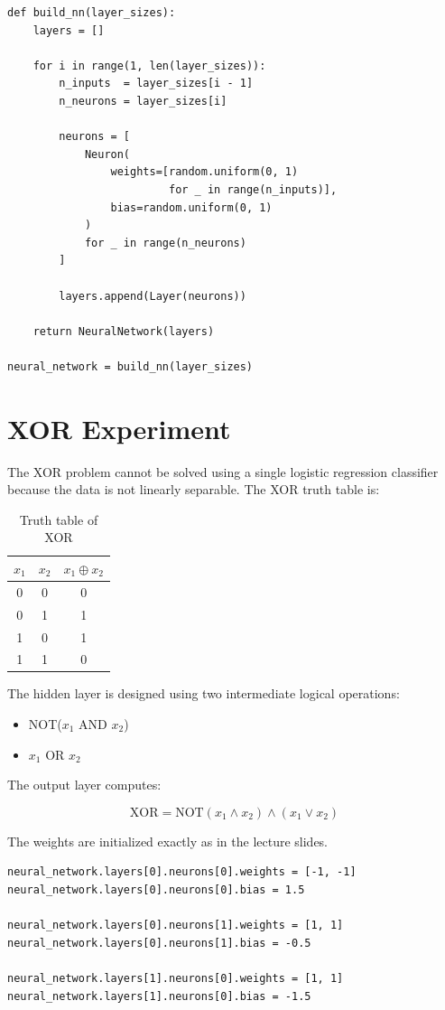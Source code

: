 \documentclass{article}
\begin{document}
\begin{verbatim}
def build_nn(layer_sizes):
    layers = []

    for i in range(1, len(layer_sizes)):
        n_inputs  = layer_sizes[i - 1]
        n_neurons = layer_sizes[i]

        neurons = [
            Neuron(
                weights=[random.uniform(0, 1)
                         for _ in range(n_inputs)],
                bias=random.uniform(0, 1)
            )
            for _ in range(n_neurons)
        ]

        layers.append(Layer(neurons))

    return NeuralNetwork(layers)

neural_network = build_nn(layer_sizes)
\end{verbatim}

\section*{XOR Experiment}

The XOR problem cannot be solved using a single logistic regression
classifier because the data is not linearly separable. The XOR truth table is:

\begin{table}[H]
\centering
\begin{tabular}{ccc}
\toprule
$x_1$ & $x_2$ & $x_1 \oplus x_2$ \\
\midrule
0 & 0 & 0 \\
0 & 1 & 1 \\
1 & 0 & 1 \\
1 & 1 & 0 \\
\bottomrule
\end{tabular}
\caption{Truth table of XOR}
\end{table}

The hidden layer is designed using two intermediate logical operations:

\begin{itemize}
    \item NOT($x_1$ AND $x_2$)
    \item $x_1$ OR $x_2$
\end{itemize}

The output layer computes:

\[
\text{XOR} = \text{NOT}(x_1 \land x_2) \land (x_1 \lor x_2)
\]

The weights are initialized exactly as in the lecture slides.

\begin{verbatim}
neural_network.layers[0].neurons[0].weights = [-1, -1]
neural_network.layers[0].neurons[0].bias = 1.5

neural_network.layers[0].neurons[1].weights = [1, 1]
neural_network.layers[0].neurons[1].bias = -0.5

neural_network.layers[1].neurons[0].weights = [1, 1]
neural_network.layers[1].neurons[0].bias = -1.5
\end{verbatim}
\end{document}
